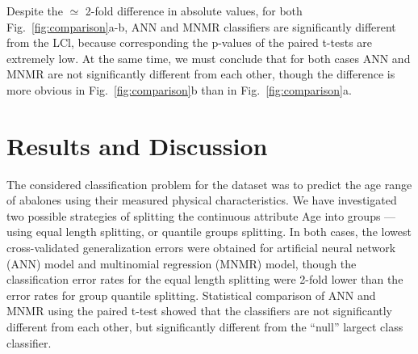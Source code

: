 \documentclass[10pt, paper=a4]{article}
\begin{document}
Despite the $\simeq$ 2-fold difference in absolute values, for both
Fig.~\ref{fig:comparison}a-b, ANN and MNMR classifiers are
significantly different from the LCl, because corresponding the
p-values of the paired t-tests are extremely low.  At the same time,
we must conclude that for both cases ANN and MNMR are not
significantly different from each other, though the difference is more
obvious in Fig.~\ref{fig:comparison}b than in
Fig.~\ref{fig:comparison}a.

\section{Results and Discussion}
\label{sec:results_and_discussion}

The considered classification problem for the dataset was to predict
the age range of abalones using their measured physical
characteristics.  We have investigated two possible strategies of
splitting the continuous attribute Age into groups --- using equal
length splitting, or quantile groups splitting.  In both cases, the
lowest cross-validated generalization errors were obtained for
artificial neural network (ANN) model and multinomial regression
(MNMR) model, though the classification error rates for the equal
length splitting were 2-fold lower than the error rates for group
quantile splitting.  Statistical comparison of ANN and MNMR using the
paired t-test showed that the classifiers are not significantly
different from each other, but significantly different from the
``null'' largect class classifier.



\end{document}
